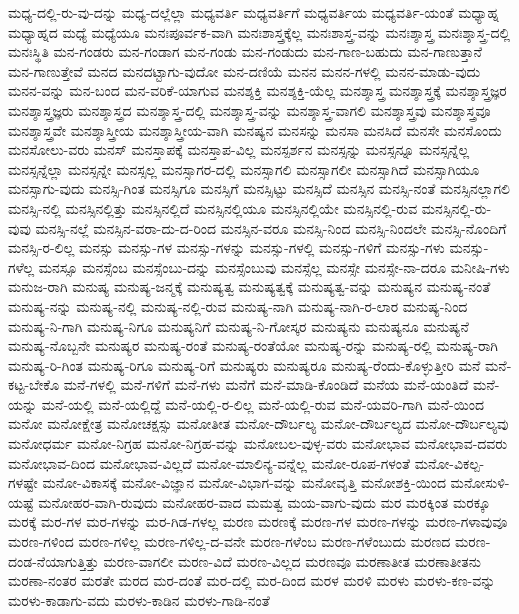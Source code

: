 {ಮಧ್ಯ-ದಲ್ಲಿ-ರು-ವು-ದನ್ನು
ಮಧ್ಯ-ದಲ್ಲೆಲ್ಲಾ
ಮಧ್ಯವರ್ತಿ
ಮಧ್ಯವರ್ತಿಗೆ
ಮಧ್ಯವರ್ತಿಯ
ಮಧ್ಯವರ್ತಿ-ಯಂತೆ
ಮಧ್ಯಾಹ್ನ
ಮಧ್ಯಾಹ್ನದ
ಮಧ್ಯೆ
ಮಧ್ಯೆಯೂ
ಮನಃಪೂರ್ವಕ-ವಾಗಿ
ಮನಃಶಾಸ್ತ್ರಕ್ಕೆಲ್ಲ
ಮನಃಶಾಸ್ತ್ರ-ವನ್ನು
ಮನಃಶ್ಶಾಸ್ತ್ರ
ಮನಃಶ್ಶಾಸ್ತ್ರ-ದಲ್ಲಿ
ಮನಃಸ್ಥಿತಿ
ಮನ-ಗಂಡರು
ಮನ-ಗಂಡಾಗ
ಮನ-ಗಂಡು
ಮನ-ಗಂಡುದು
ಮನ-ಗಾಣ-ಬಹುದು
ಮನ-ಗಾಣುತ್ತಾನೆ
ಮನ-ಗಾಣುತ್ತೇವೆ
ಮನದ
ಮನದಟ್ಟಾಗು-ವುದೋ
ಮನ-ದಣಿಯೆ
ಮನನ
ಮನನ-ಗಳಲ್ಲಿ
ಮನನ-ಮಾಡು-ವುದು
ಮನನ-ವನ್ನು
ಮನ-ಬಂದ
ಮನ-ವರಿಕೆ-ಯಾಗುವ
ಮನಶ್ಶಕ್ತಿ
ಮನಶ್ಶಕ್ತಿ-ಯೆಲ್ಲ
ಮನಶ್ಶಾಸ್ತ್ರ
ಮನಶ್ಶಾಸ್ತ್ರಕ್ಕೆ
ಮನಶ್ಶಾಸ್ತ್ರಜ್ಞರ
ಮನಶ್ಶಾಸ್ತ್ರಜ್ಞರು
ಮನಶ್ಶಾಸ್ತ್ರದ
ಮನಶ್ಶಾಸ್ತ್ರ-ದಲ್ಲಿ
ಮನಶ್ಶಾಸ್ತ್ರ-ವನ್ನು
ಮನಶ್ಶಾಸ್ತ್ರ-ವಾಗಲಿ
ಮನಶ್ಶಾಸ್ತ್ರವು
ಮನಶ್ಶಾಸ್ತ್ರವೂ
ಮನಶ್ಶಾಸ್ತ್ರವೇ
ಮನಶ್ಶಾಸ್ತ್ರೀಯ
ಮನಶ್ಶಾಸ್ತ್ರೀಯ-ವಾಗಿ
ಮನಷ್ಯನ
ಮನಸನ್ನು
ಮನಸಾ
ಮನಸಿದೆ
ಮನಸೇ
ಮನಸೊಂದು
ಮನಸೋಲು-ವರು
ಮನಸ್
ಮನಸ್ತಾಪಕ್ಕೆ
ಮನಸ್ತಾಪ-ವಿಲ್ಲ
ಮನಸ್ಪರ್ಶನ
ಮನಸ್ಸನ್ನು
ಮನಸ್ಸನ್ನೂ
ಮನಸ್ಸನ್ನೆಲ್ಲ
ಮನಸ್ಸನ್ನೆಲ್ಲಾ
ಮನಸ್ಸನ್ನೇ
ಮನಸ್ಸಲ್ಲ
ಮನಸ್ಸಾಗರ-ದಲ್ಲಿ
ಮನಸ್ಸಾಗಲಿ
ಮನಸ್ಸಾಗಲೀ
ಮನಸ್ಸಾಗಿದೆ
ಮನಸ್ಸಾಗಿಯೂ
ಮನಸ್ಸಾಗು-ವುದು
ಮನಸ್ಸಿ-ಗಿಂತ
ಮನಸ್ಸಿಗೂ
ಮನಸ್ಸಿಗೆ
ಮನಸ್ಸಿಟ್ಟು
ಮನಸ್ಸಿದೆ
ಮನಸ್ಸಿನ
ಮನಸ್ಸಿ-ನಂತೆ
ಮನಸ್ಸಿನಲ್ಲಾಗಲಿ
ಮನಸ್ಸಿ-ನಲ್ಲಿ
ಮನಸ್ಸಿನಲ್ಲಿತ್ತು
ಮನಸ್ಸಿನಲ್ಲಿದೆ
ಮನಸ್ಸಿನಲ್ಲಿಯೂ
ಮನಸ್ಸಿನಲ್ಲಿಯೇ
ಮನಸ್ಸಿನಲ್ಲಿ-ರುವ
ಮನಸ್ಸಿನಲ್ಲಿ-ರು-ವುವು
ಮನಸ್ಸಿ-ನಲ್ಲೆ
ಮನಸ್ಸಿನ-ವರಾ-ದು-ದ-ರಿಂದ
ಮನಸ್ಸಿನ-ವರೂ
ಮನಸ್ಸಿ-ನಿಂದ
ಮನಸ್ಸಿ-ನಿಂದಲೇ
ಮನಸ್ಸಿ-ನೊಂದಿಗೆ
ಮನಸ್ಸಿ-ರ-ಲಿಲ್ಲ
ಮನಸ್ಸು
ಮನಸ್ಸು-ಗಳ
ಮನಸ್ಸು-ಗಳನ್ನು
ಮನಸ್ಸು-ಗಳಲ್ಲಿ
ಮನಸ್ಸು-ಗಳಿಗೆ
ಮನಸ್ಸು-ಗಳು
ಮನಸ್ಸು-ಗಳೆಲ್ಲ
ಮನಸ್ಸೂ
ಮನಸ್ಸೆಂಬ
ಮನಸ್ಸೆಂಬು-ದನ್ನು
ಮನಸ್ಸೆಂಬುವು
ಮನಸ್ಸೆಲ್ಲ
ಮನಸ್ಸೇ
ಮನಸ್ಸೇ-ನಾ-ದರೂ
ಮನೀಷಿ-ಗಳು
ಮನುಜ-ರಾಗಿ
ಮನುಷ್ಯ
ಮನುಷ್ಯ-ಜನ್ಮಕ್ಕೆ
ಮನುಷ್ಯತ್ವ
ಮನುಷ್ಯತ್ವಕ್ಕೆ
ಮನುಷ್ಯತ್ವ-ವನ್ನು
ಮನುಷ್ಯನ
ಮನುಷ್ಯ-ನಂತೆ
ಮನುಷ್ಯ-ನನ್ನು
ಮನುಷ್ಯ-ನಲ್ಲಿ
ಮನುಷ್ಯ-ನಲ್ಲಿ-ರುವ
ಮನುಷ್ಯ-ನಾಗಿ
ಮನುಷ್ಯ-ನಾಗಿ-ರ-ಲಾರ
ಮನುಷ್ಯ-ನಿಂದ
ಮನುಷ್ಯ-ನಿ-ಗಾಗಿ
ಮನುಷ್ಯ-ನಿಗೂ
ಮನುಷ್ಯನಿಗೆ
ಮನುಷ್ಯ-ನಿ-ಗೋಸ್ಕರ
ಮನುಷ್ಯನು
ಮನುಷ್ಯನೂ
ಮನುಷ್ಯನೆ
ಮನುಷ್ಯ-ನೊಬ್ಬನೇ
ಮನುಷ್ಯರ
ಮನುಷ್ಯ-ರಂತೆ
ಮನುಷ್ಯ-ರಂತೆಯೋ
ಮನುಷ್ಯ-ರನ್ನು
ಮನುಷ್ಯ-ರಲ್ಲಿ
ಮನುಷ್ಯ-ರಾಗಿ
ಮನುಷ್ಯ-ರಿ-ಗಿಂತ
ಮನುಷ್ಯ-ರಿಗೂ
ಮನುಷ್ಯ-ರಿಗೆ
ಮನುಷ್ಯರು
ಮನುಷ್ಯರೂ
ಮನುಷ್ಯ-ರೆಂದು-ಕೊಳ್ಳುತ್ತೀರಿ
ಮನೆ
ಮನೆ-ಕಟ್ಟ-ಬೇಕೊ
ಮನೆ-ಗಳಲ್ಲಿ
ಮನೆ-ಗಳಿಗೆ
ಮನೆ-ಗಳು
ಮನೆಗೆ
ಮನೆ-ಮಾಡಿ-ಕೊಂಡಿದೆ
ಮನೆಯ
ಮನೆ-ಯಂತಿದೆ
ಮನೆ-ಯನ್ನು
ಮನೆ-ಯಲ್ಲಿ
ಮನೆ-ಯಲ್ಲಿದ್ದೆ
ಮನೆ-ಯಲ್ಲಿ-ರ-ಲಿಲ್ಲ
ಮನೆ-ಯಲ್ಲಿ-ರುವ
ಮನೆ-ಯವರಿ-ಗಾಗಿ
ಮನೆ-ಯಿಂದ
ಮನೋ
ಮನೋಕ್ಷೇತ್ರ
ಮನೋಚಕ್ಷಸ್ಸು
ಮನೋತೀತ
ಮನೋ-ದೌರ್ಬಲ್ಯ
ಮನೋ-ದೌರ್ಬಲ್ಯದ
ಮನೋ-ದೌರ್ಬಲ್ಯವು
ಮನೋಧರ್ಮ
ಮನೋ-ನಿಗ್ರಹ
ಮನೋ-ನಿಗ್ರಹ-ವನ್ನು
ಮನೋಬಲ-ವುಳ್ಳ-ವರು
ಮನೋಭಾವ
ಮನೋಭಾವ-ದವರು
ಮನೋಭಾವ-ದಿಂದ
ಮನೋಭಾವ-ವಿಲ್ಲದೆ
ಮನೋ-ಮಾಲಿನ್ಯ-ವನ್ನೆಲ್ಲ
ಮನೋ-ರೂಪ-ಗಳಂತೆ
ಮನೋ-ವಿಕಲ್ಪ-ಗಳಷ್ಟೇ
ಮನೋ-ವಿಕಾಸಕ್ಕೆ
ಮನೋ-ವಿಜ್ಞಾನ
ಮನೋ-ವಿಭಾಗ-ವನ್ನು
ಮನೋವೃತ್ತಿ
ಮನೋಶಕ್ತಿ-ಯಿಂದ
ಮನೋಸುಳಿ-ಯಷ್ಟೆ
ಮನೋಹರ-ವಾಗಿ-ರುವುದು
ಮನೋಹರ-ವಾದ
ಮಮತ್ವ
ಮಯ-ವಾಗು-ವುದು
ಮರ
ಮರಕ್ಕಿಂತ
ಮರಕ್ಕೂ
ಮರಕ್ಕೆ
ಮರ-ಗಳ
ಮರ-ಗಳನ್ನು
ಮರ-ಗಿಡ-ಗಳಲ್ಲ
ಮರಣ
ಮರಣಕ್ಕೆ
ಮರಣ-ಗಳ
ಮರಣ-ಗಳನ್ನು
ಮರಣ-ಗಳಾವುವೂ
ಮರಣ-ಗಳಿಂದ
ಮರಣ-ಗಳಿಲ್ಲ
ಮರಣ-ಗಳಿಲ್ಲ-ದ-ವನೇ
ಮರಣ-ಗಳೆಂಬ
ಮರಣ-ಗಳೆಂಬುದು
ಮರಣದ
ಮರಣ-ದಂಡ-ನೆಯಾಗುತ್ತಿತ್ತು
ಮರಣ-ವಾಗಲೀ
ಮರಣ-ವಿದೆ
ಮರಣ-ವಿಲ್ಲದ
ಮರಣವೂ
ಮರಣಾತೀತ
ಮರಣಾತೀತನು
ಮರಣಾ-ನಂತರ
ಮರತೇ
ಮರದ
ಮರ-ದಂತೆ
ಮರ-ದಲ್ಲಿ
ಮರ-ದಿಂದ
ಮರಳ
ಮರಳಿ
ಮರಳು
ಮರಳು-ಕಣ-ವನ್ನು
ಮರಳು-ಕಾಡಾಗು-ವದು
ಮರಳು-ಕಾಡಿನ
ಮರಳು-ಗಾಡಿ-ನಂತೆ
}
